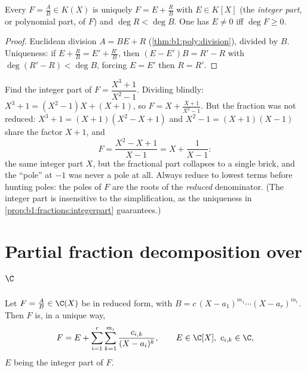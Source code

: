 \begin{proposition}\label{prop:b1:fractions:integerpart}
Every $F = \frac AB \in K(X)$ is uniquely $F = E + \frac RB$ with $E
\in K[X]$ (the \emph{integer part}, or polynomial part, of $F$) and
$\deg R < \deg B$. One has $E \neq 0$ iff $\deg F \geq 0$.
\end{proposition}

\begin{proof}
Euclidean division $A = BE + R$ (\cref{thm:b1:poly:division}), divided
by $B$. Uniqueness: if $E + \frac RB = E' + \frac{R'}{B}$, then $(E -
E')B = R' - R$ with $\deg(R' - R) < \deg B$, forcing $E = E'$ then $R
= R'$.
\end{proof}

\begin{example}\label{ex:b1:fractions:integerpart}
Find the integer part of $F = \dfrac{X^3 + 1}{X^2 - 1}$. Dividing
blindly: $X^3 + 1 = (X^2 - 1)X + (X + 1)$, so $F = X +
\frac{X + 1}{X^2 - 1}$. But the fraction was not reduced: $X^3 + 1
= (X + 1)(X^2 - X + 1)$ and $X^2 - 1 = (X+1)(X-1)$ share the factor
$X + 1$, and
\[
F = \frac{X^2 - X + 1}{X - 1} = X + \frac{1}{X - 1} :
\]
the same integer part $X$, but the fractional part collapses to a
single brick, and the ``pole'' at $-1$ was never a pole at all.
Always reduce to lowest terms before hunting poles: the poles of
$F$ are the roots of the \emph{reduced} denominator. (The integer
part is insensitive to the simplification, as the uniqueness in
\cref{prop:b1:fractions:integerpart} guarantees.)
\end{example}

\section{Partial fraction decomposition over $\C$}

\begin{theorem}\label{thm:b1:fractions:complex}
Let $F = \frac AB \in \C(X)$ be in reduced form, with $B = c\,(X -
a_1)^{m_1} \cdots (X - a_r)^{m_r}$. Then $F$ is, in a unique way,
\[
F = E + \sum_{i=1}^{r} \sum_{k=1}^{m_i}
\frac{c_{i,k}}{(X - a_i)^k},
\qquad E \in \C[X],\ c_{i,k} \in \C ,
\]
$E$ being the integer part of $F$.
\end{theorem}

